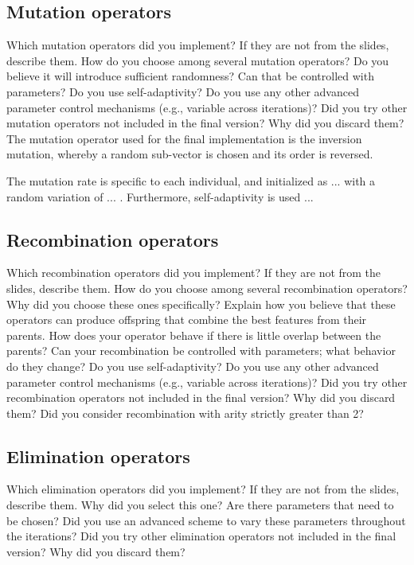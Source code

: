 \documentclass[a4paper,10pt]{article}
\newcommand{\ReplaceMe}[1]{{\color{blue}#1}}
\begin{document}
\subsection{Mutation operators}
\label{mutation}
\ReplaceMe{Which mutation operators did you implement? If they are not from the slides, describe them. How do you choose among several mutation operators? Do you believe it will introduce sufficient randomness? Can that be controlled with parameters? Do you use self-adaptivity? Do you use any other advanced parameter control mechanisms (e.g., variable across iterations)? Did you try other mutation operators not included in the final version? Why did you discard them?}
The mutation operator used for the final implementation is the inversion mutation, whereby a random sub-vector is chosen and its order is reversed.

The mutation rate is specific to each individual, and initialized as ... %
with a random variation of ... %
. Furthermore, self-adaptivity is used ... %

\subsection{Recombination operators}
\label{recombination}
\ReplaceMe{Which recombination operators did you implement? If they are not from the slides, describe them. How do you choose among several recombination operators? Why did you choose these ones specifically? Explain how you believe that these operators can produce offspring that combine the best features from their parents. How does your operator behave if there is little overlap between the parents? Can your recombination be controlled with parameters; what behavior do they change? Do you use self-adaptivity? Do you use any other advanced parameter control mechanisms (e.g., variable across iterations)? Did you try other recombination operators not included in the final version? Why did you discard them? Did you consider recombination with arity strictly greater than 2?}

\subsection{Elimination operators}
\label{elimination}
\ReplaceMe{Which elimination operators did you implement? If they are not from the slides, describe them. Why did you select this one? Are there parameters that need to be chosen? Did you use an advanced scheme to vary these parameters throughout the iterations? Did you try other elimination operators not included in the final version? Why did you discard them?} 
\end{document}
